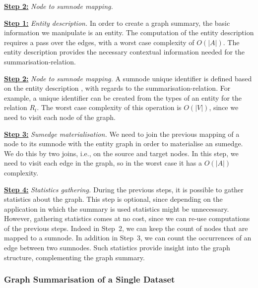 \begin{labeling}{\textbf{\underline{Step 2:}} \emph{Node to sumnode mapping.}}
	\item[\textbf{\underline{Step 1:}} \emph{Entity description.}]
	\label{step-ed}
	In order to create a graph summary, the basic information we manipulate is an entity. The computation of the entity description  requires a pass over the edges, with a worst case complexity of $O(\vert A \vert)$. The entity description provides the necessary contextual information needed for the \gls{summarisation-relation}.

	\item[\textbf{\underline{Step 2:}} \emph{Node to sumnode mapping.}]
	\label{step-hn}
	A sumnode unique identifier is defined based on the entity description , with regards to the \gls{summarisation-relation}.
	For example, a unique identifier can be created from the \gls{types} of an entity for the relation $R_t$.
	The worst case complexity of this operation is $O(\vert V \vert)$, since we need to visit each node of the graph.

	\item[\textbf{\underline{Step 3:}} \emph{Sumedge materialisation.}]
	\label{step-he}
	We need to join the previous mapping of a node to its sumnode with the entity graph in order to materialise an sumedge. We do this by two joins, i.e., on the source and target nodes. In this step, we need to visit each edge in the graph, so in the worst case it has a $O\left(\vert A \vert\right)$ complexity.

	\item[\textbf{\underline{Step 4:}} \emph{Statistics gathering.}]
	\label{step-stats}
	During the previous steps, it is possible to gather statistics about the graph. This step is optional, since depending on the application in which the summary is used statistics might be unnecessary. However, gathering statistics comes at no cost, since we can re-use computations of the previous steps. Indeed in Step~2, we can keep the count of nodes that are mapped to a sumnode. In addition in Step~3, we can count the occurrences of an edge between two sumnodes. Such statistics provide insight into the graph structure, complementing the graph summary.
\end{labeling}

\subsubsection{Graph Summarisation of a Single Dataset}
\label{sec:alg-single-ds}

